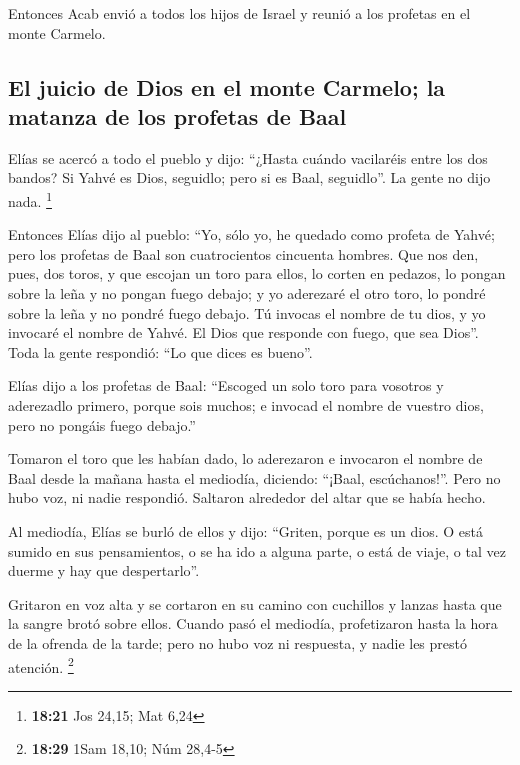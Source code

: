  Entonces Acab envió a todos los hijos de Israel y reunió
a los profetas en el monte Carmelo.

\hypertarget{el-juicio-de-dios-en-el-monte-carmelo-la-matanza-de-los-profetas-de-baal}{%
\subsection{El juicio de Dios en el monte Carmelo; la matanza de los
profetas de
Baal}\label{el-juicio-de-dios-en-el-monte-carmelo-la-matanza-de-los-profetas-de-baal}}

 Elías se acercó a todo el pueblo y dijo: ``¿Hasta cuándo
vacilaréis entre los dos bandos? Si Yahvé es Dios, seguidlo; pero si es
Baal, seguidlo''. La gente no dijo nada. \footnote{\textbf{18:21} Jos
  24,15; Mat 6,24}

 Entonces Elías dijo al pueblo: ``Yo, sólo yo, he quedado
como profeta de Yahvé; pero los profetas de Baal son cuatrocientos
cincuenta hombres.  Que nos den, pues, dos toros, y que
escojan un toro para ellos, lo corten en pedazos, lo pongan sobre la
leña y no pongan fuego debajo; y yo aderezaré el otro toro, lo pondré
sobre la leña y no pondré fuego debajo.  Tú invocas el
nombre de tu dios, y yo invocaré el nombre de Yahvé. El Dios que
responde con fuego, que sea Dios''. Toda la gente respondió: ``Lo que
dices es bueno''.

 Elías dijo a los profetas de Baal: ``Escoged un solo
toro para vosotros y aderezadlo primero, porque sois muchos; e invocad
el nombre de vuestro dios, pero no pongáis fuego debajo.''

 Tomaron el toro que les habían dado, lo aderezaron e
invocaron el nombre de Baal desde la mañana hasta el mediodía, diciendo:
``¡Baal, escúchanos!''. Pero no hubo voz, ni nadie respondió. Saltaron
alrededor del altar que se había hecho.

 Al mediodía, Elías se burló de ellos y dijo: ``Griten,
porque es un dios. O está sumido en sus pensamientos, o se ha ido a
alguna parte, o está de viaje, o tal vez duerme y hay que despertarlo''.

 Gritaron en voz alta y se cortaron en su camino con
cuchillos y lanzas hasta que la sangre brotó sobre ellos.
 Cuando pasó el mediodía, profetizaron hasta la hora de
la ofrenda de la tarde; pero no hubo voz ni respuesta, y nadie les
prestó atención. \footnote{\textbf{18:29} 1Sam 18,10; Núm 28,4-5}


